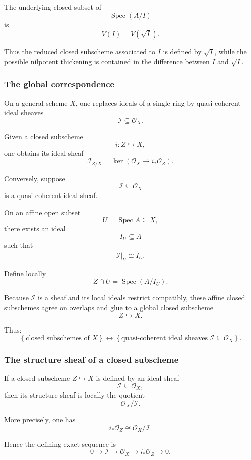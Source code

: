 The underlying closed subset of
\[
\operatorname{Spec}(A/I)
\]
is
\[
V(I)=V(\sqrt I).
\]

Thus the reduced closed subscheme associated to \(I\) is defined by \(\sqrt I\), while the possible nilpotent thickening is contained in the difference between \(I\) and \(\sqrt I\).

\subsubsection{The global correspondence}

On a general scheme \(X\), one replaces ideals of a single ring by quasi-coherent ideal sheaves
\[
\mathcal{I}\subseteq\mathcal{O}_X.
\]

Given a closed subscheme
\[
i:Z\hookrightarrow X,
\]
one obtains its ideal sheaf
\[
\mathcal{I}_{Z/X}
=
\ker(\mathcal{O}_X\to i_*\mathcal{O}_Z).
\]

Conversely, suppose
\[
\mathcal{I}\subseteq\mathcal{O}_X
\]
is a quasi-coherent ideal sheaf.

On an affine open subset
\[
U=\operatorname{Spec} A\subseteq X,
\]
there exists an ideal
\[
I_U\subseteq A
\]
such that
\[
\mathcal{I}|_U\cong\widetilde{I_U}.
\]

Define locally
\[
Z\cap U=\operatorname{Spec}(A/I_U).
\]

Because \(\mathcal{I}\) is a sheaf and its local ideals restrict compatibly, these affine closed subschemes agree on overlaps and glue to a global closed subscheme
\[
Z\hookrightarrow X.
\]

Thus:
\[
\boxed{
	\left\{
	\text{closed subschemes of }X
	\right\}
	\longleftrightarrow
	\left\{
	\text{quasi-coherent ideal sheaves }
	\mathcal{I}\subseteq\mathcal{O}_X
	\right\}.
}
\]

\subsubsection{The structure sheaf of a closed subscheme}

If a closed subscheme \(Z\hookrightarrow X\) is defined by an ideal sheaf
\[
\mathcal{I}\subseteq\mathcal{O}_X,
\]
then its structure sheaf is locally the quotient
\[
\mathcal{O}_X/\mathcal{I}.
\]

More precisely, one has
\[
i_*\mathcal{O}_Z\cong \mathcal{O}_X/\mathcal{I}.
\]

Hence the defining exact sequence is
\[
\boxed{
	0
	\longrightarrow
	\mathcal{I}
	\longrightarrow
	\mathcal{O}_X
	\longrightarrow
	i_*\mathcal{O}_Z
	\longrightarrow
	0.
}
\]

